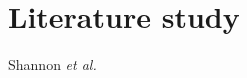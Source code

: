 
\section{Literature study}

Shannon {\it et al.}\cite{Shannon:A_Mathematical_Theory_of_Communications}


\newpage




